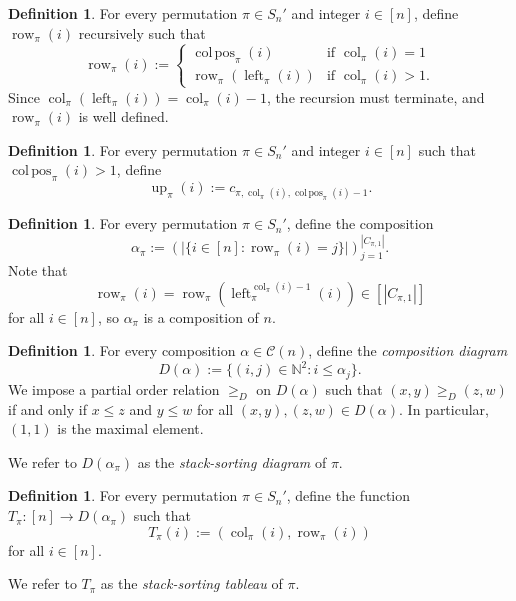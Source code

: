 \documentclass[12pt]{amsart}
\DeclareMathOperator{\col}{col}
\DeclareMathOperator{\colpos}{col\,pos}
\DeclareMathOperator{\leftof}{left}
\DeclareMathOperator{\row}{row}
\DeclareMathOperator{\upof}{up}
\theoremstyle{definition}
\newtheorem{definition}[theorem]{Definition}
\begin{document}
\begin{definition}
For every permutation $\pi\in S_n'$ and integer $i\in[n]$, define $\row_{\pi}(i)$ recursively such that \[
\row_{\pi}(i):=
\begin{cases}
\colpos_{\pi}(i) & \text{if } \col_{\pi}(i)=1\\
\row_{\pi}(\leftof_{\pi}(i)) & \text{if } \col_{\pi}(i)>1.
\end{cases}
\] Since $\col_{\pi}(\leftof_{\pi}(i))=\col_{\pi}(i)-1$, the recursion must terminate, and $\row_{\pi}(i)$ is well defined.
\end{definition}
\begin{definition}
For every permutation $\pi\in S_n'$ and integer $i\in[n]$ such that $\colpos_{\pi}(i)>1$, define \[\upof_{\pi}(i):=c_{\pi,\col_{\pi}(i),\colpos_{\pi}(i)-1}.\]
\end{definition}
\begin{definition}
For every permutation $\pi\in S_n'$, define the composition 
\[\alpha_{\pi}:=\left(\left|\{i\in[n]: \row_{\pi}(i)=j\}\right|\right)_{j=1}^{|C_{\pi,1}|}.\]
Note that \[\row_{\pi}(i)=\row_{\pi}(\leftof_{\pi}^{\col_{\pi}(i)-1}(i))\in [|C_{\pi,1}|]\] for all $i\in [n]$, so $\alpha_{\pi}$ is a composition of $n$. 
\end{definition}
\begin{definition}
For every composition $\alpha\in \mathcal{C}(n)$, define the \emph{composition diagram}
\[D(\alpha) := \{(i,j)\in \mathbb{N}^2: i\le \alpha_j\}.\]
We impose a partial order relation $\ge_D$ on $D(\alpha)$ such that $(x,y)\ge_{D}(z,w)$ if and only if $x\le z$ and $y\le w$ for all $(x,y),(z,w)\in D(\alpha)$. In particular, $(1,1)$ is the maximal element.
\end{definition}
We refer to $D(\alpha_\pi)$ as the \emph{stack-sorting diagram} of $\pi$.
\begin{definition}
For every permutation $\pi\in S_n'$, define the function $T_{\pi}:[n]\to D(\alpha_\pi)$ such that
\[T_{\pi}(i):=(\col_{\pi}(i), \row_{\pi}(i))\]
for all $i\in[n]$.
\end{definition}
We refer to $T_{\pi}$ as the \emph{stack-sorting tableau} of $\pi$.
\end{document}
